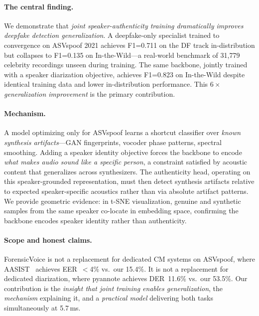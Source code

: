 \documentclass{article}
\newcommand{\fv}{ForensicVoice}
\begin{document}
\paragraph{The central finding.}
We demonstrate that \emph{joint speaker-authenticity training dramatically
improves deepfake detection generalization}. A deepfake-only specialist trained
to convergence on ASVspoof 2021 achieves F1=0.711 on the DF track in-distribution but collapses
to F1=0.135 on In-the-Wild---a real-world benchmark of 31{,}779 celebrity
recordings unseen during training. The same backbone, jointly trained with a
speaker diarization objective, achieves F1=0.823 on In-the-Wild despite
identical training data and lower in-distribution performance. This
\emph{$6\times$ generalization improvement} is the primary contribution.

\paragraph{Mechanism.}
A model optimizing only for ASVspoof learns a shortcut classifier over
\emph{known synthesis artifacts}---GAN fingerprints, vocoder phase patterns,
spectral smoothing. Adding a speaker identity objective forces the backbone to
encode \emph{what makes audio sound like a specific person}, a constraint
satisfied by acoustic content that generalizes across synthesizers. The
authenticity head, operating on this speaker-grounded representation, must then
detect synthesis artifacts relative to expected speaker-specific acoustics
rather than via absolute artifact patterns. We provide geometric evidence:
in t-SNE visualization, genuine and synthetic samples from the same speaker
co-locate in embedding space, confirming the backbone encodes speaker identity
rather than authenticity.

\paragraph{Scope and honest claims.}
\fv{} is not a replacement for dedicated CM systems on ASVspoof, where
AASIST~\citep{jung2022aasist} achieves EER~$<$4\% vs.\ our 15.4\%.
It is not a replacement for dedicated diarization, where pyannote achieves
DER~11.6\% vs.\ our 53.5\%. Our contribution is the \emph{insight that joint
training enables generalization}, the \emph{mechanism} explaining it, and
a \emph{practical model} delivering both tasks simultaneously at 5.7\,ms.
\end{document}
